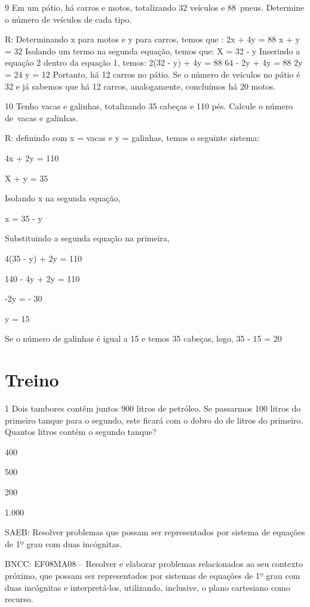 {\num{9} Em um pátio, há carros e motos, totalizando 32 veículos e 88~pneus.
Determine o número de veículos de cada tipo.

R: Determinando x para motos e y para carros, temos que :
2x + 4y = 88
x + y = 32
Isolando um termo na segunda equação, temos que:
X = 32 - y
Inserindo a equação 2 dentro da equação 1, temos:
2(32 - y) + 4y = 88
64 - 2y + 4y = 88
2y = 24
y = 12
Portanto, há 12 carros no pátio.
Se o número de veículos no pátio é 32 e já sabemos que há 12 carros,
analogamente, concluímos há 20 motos.

\num{10} Tenho vacas e galinhas, totalizando 35 cabeças e 110 pés. Calcule o
número de~vacas e galinhas.

R: definindo com x = vacas e y = galinhas, temos o seguinte sistema:

4x + 2y = 110

X + y = 35

Isolando x na segunda equação,

x = 35 - y

Substituindo a segunda equação na primeira,

4(35 - y) + 2y = 110

140 - 4y + 2y = 110

-2y = - 30

y = 15

Se o número de galinhas é igual a 15 e temos 35 cabeças, logo, 35 - 15 =
20

\section{Treino}

\num{1} Dois tambores contêm juntos 900 litros de petróleo. Se passarmos 100
litros do primeiro tanque para o segundo, este ficará com o dobro do de
litros do primeiro. Quantos litros contém o segundo tanque?
\item 400
\item 500
\item 200
\item 1.000

SAEB: Resolver problemas que possam ser representados por sistema de
equações de 1º grau com duas incógnitas.

BNCC: EF08MA08 -- Resolver e elaborar problemas relacionados ao seu
contexto próximo, que possam ser representados por sistemas de equações
de 1º grau com duas incógnitas e interpretá-los, utilizando, inclusive,
o plano cartesiano como recurso.

}

